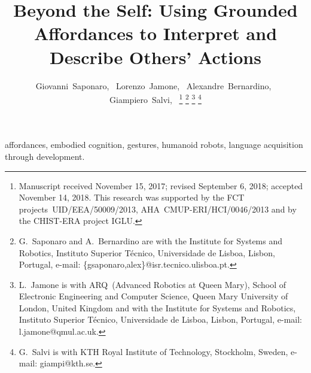 \documentclass[journal]{IEEEtran}
\begin{document}
\title{Beyond the Self: Using Grounded Affordances to Interpret and Describe Others' Actions}

\author{Giovanni~Saponaro,~
        Lorenzo~Jamone,~
        Alexandre~Bernardino,~
        Giampiero~Salvi,~
        \thanks{
          Manuscript received November 15, 2017; revised September 6, 2018; accepted November 14, 2018. This research was supported by the FCT projects~UID/EEA/50009/2013, AHA~CMUP-ERI/HCI/0046/2013 and by the CHIST-ERA project IGLU.}
\thanks{G.~Saponaro and A.~Bernardino are with the
Institute for Systems and Robotics, Instituto Superior Técnico,
Universidade de Lisboa, Lisbon, Portugal, e-mail: \{gsaponaro,alex\}@isr.tecnico.ulisboa.pt.}
\thanks{L.~Jamone is with ARQ~(Advanced Robotics at Queen Mary), School of Electronic Engineering and Computer Science, Queen Mary University of London, United Kingdom
and with the
Institute for Systems and Robotics, Instituto Superior Técnico, Universidade de Lisboa, Lisbon, Portugal,
e-mail: l.jamone@qmul.ac.uk.}
\thanks{G.~Salvi is with KTH Royal Institute of Technology, Stockholm, Sweden,
  e-mail: giampi@kth.se.}
}

\maketitle
\IEEEpeerreviewmaketitle

\begin{abstract}
  
\end{abstract}

\begin{IEEEkeywords}
affordances, embodied cognition, gestures, humanoid robots, language acquisition through development.
\end{IEEEkeywords}








\end{document}
